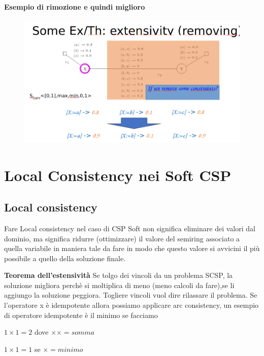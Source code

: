 \subsubsection{Esempio di rimozione e quindi miglioro}
\begin{figure}[htp]
	\centering
    \includegraphics[width=12.5cm, keepaspectratio]{img/Cap4/better2.png}
\end{figure}


\chapter{Local Consistency nei Soft CSP} \label{ch:Local Consistency nei Soft CSP}
\section{Local consistency}
Fare Local consistency nel caso di CSP Soft non significa eliminare dei valori dal dominio, ma significa ridurre (ottimizzare) il valore del semiring associato a quella variabile in maniera tale da fare in modo che questo valore si avvicini il più possibile a quello della soluzione finale.

\textbf{Teorema dell’estensività} Se tolgo dei vincoli da un problema SCSP, la
soluzione migliora perchè si moltiplica di meno (meno calcoli da fare),se li aggiungo la
soluzione peggiora. Togliere vincoli vuol dire rilassare il problema.
Se l’operatore x è idempotente allora possiamo applicare arc consistency, un esempio
di operatore idempotente è il minimo se facciamo
\begin{center}
    $1 \times 1 = 2$ dove $×\times = somma$
\end{center}
\begin{center}
    $1 \times 1 = 1$ se $\times = minimo$
\end{center}
